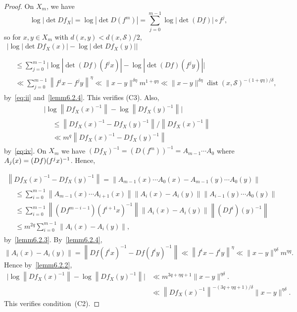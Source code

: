 \documentclass[AHL,Unicode,longabstracts,published]{cedram}
\newcommand{\cS}{\mathcal{S}}
\DeclareMathOperator{\dist}{dist}
\begin{document}
\begin{proof}
On $X_m$, we have
\[
\log\left|\det Df_X\right|=\log\left|\det D(f^m)\right| =\sum_{j=0}^{m-1}\log\left|\det(Df)\right|\circ f^j,
\]
so for $x,y\in X_m$ with $d(x,y)<d(x,\cS)/2$,
\begin{multline*}
\big|\log\left|\det Df_X(x)\right| -\log\left|\det Df_X(y)\right|\big|\\
\begin{aligned}
\\ & \le
\sum_{j=0}^{m-1}\Big|\log\left|\det (Df)(f^jx)\right|- \log\left|\det (Df)(f^jy)\right|\Big|
\\ & \ll \sum_{j=0}^{m-1}\left\|f^jx-f^jy\right\|^\eta
\ll \|x-y\|^{\delta\eta}m^{1+q\eta}
\ll \|x-y\|^{\delta\eta}\dist(x,\cS)^{-(1+q\eta)/\delta},
\end{aligned}
\end{multline*}
by~\eqref{eq:ii} and~\eqref{lemm6.2.4}. This verifies (C3). Also,
\begin{multline*}
\Big|\log\left\|Df_X(x)^{-1}\right\|- \log\left\|Df_X(y)^{-1}\right\|\Big|\\
\begin{aligned}
& \le \left\|Df_X(x)^{-1}-Df_X(y)^{-1}\right\|/\left\|Df_X(x)^{-1}\right\|
\\ & \ll m^q \left\|Df_X(x)^{-1}-Df_X(y)^{-1}\right\|
\end{aligned}
\end{multline*}
by~\eqref{eq:iv}. On $X_m$ we have $(Df_X)^{-1}=(D(f^m))^{-1} =A_{m-1}\cdots A_0$ where $A_j(x)\linebreak=(Df)(f^jx)^{-1}$. Hence,


\begin{multline*}
\left\|Df_X(x)^{-1}- Df_X(y)^{-1}\right\| =\left\|A_{m-1}(x)\cdots A_0(x)- A_{m-1}(y)\cdots A_0(y)\right\|\\
\begin{aligned}
&\le\sum_{i=0}^{m-1}\left\|A_{m-1}(x)\cdots A_{i+1}(x)\right\|
\left\|A_i(x)-A_i(y)\right\|
\left\|A_{i-1}(y)\cdots A_0(y)\right\|
\\ &
\le\sum_{i=0}^{m-1}\left\|\left(Df^{m-i-1}\right)\left(f^{i+1}x\right)^{-1}\right\|
\left\|A_i(x)-A_i(y)\right\|
\left\|(Df^i)(y)^{-1}\right\|
\\ & \le m^{2q}\sum_{i=0}^{m-1}
\left\|A_i(x)-A_i(y)\right\|,
\end{aligned}
\end{multline*}
by~\eqref{lemm6.2.3}. By~\eqref{lemm6.2.4},
\[
\left\|A_i(x)-A_i(y)\right\|=\left\|Df(f^ix)^{-1}-Df(f^iy)^{-1}\right\|
\ll \left\|f^ix-f^iy\right\|^\eta\ll \|x-y\|^{\eta\delta}m^{\eta q}.
\]
Hence by~\eqref{lemm6.2.2},
\begin{align*}
\big|\log\left\|Df_X(x)^{-1}\right\|- \log\left\|Df_X(y)^{-1}\right\|\big| & \ll m^{3q+\eta q+1} \|x-y\|^{\eta \delta}.
\\ & \ll \left\|Df_X(x)^{-1}\right\|^{-\left(3q+\eta q+1\right)/\delta} \|x-y\|^{\eta \delta}.
\end{align*}
This verifies condition~(C2).


\end{proof}
\end{document}
